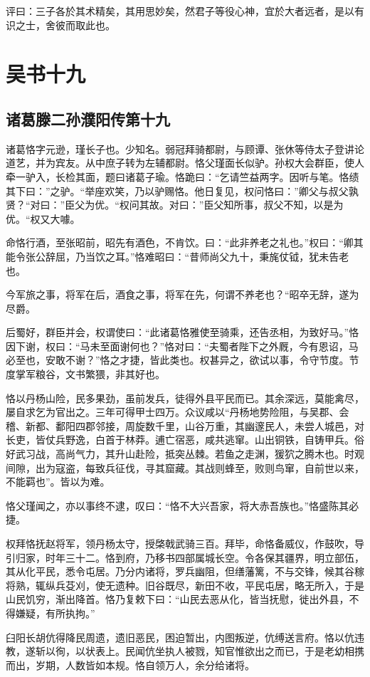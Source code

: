 \documentclass[12pt,UTF8]{ctexbook}
\begin{document}
评曰：三子各於其术精矣，其用思妙矣，然君子等役心神，宜於大者远者，是以有识之士，舍彼而取此也。

\part{吴书十九}
\chapter{诸葛滕二孙濮阳传第十九}

诸葛恪字元逊，瑾长子也。少知名。弱冠拜骑都尉，与顾谭、张休等侍太子登讲论道艺，并为宾友。从中庶子转为左辅都尉。恪父瑾面长似驴。孙权大会群臣，使人牵一驴入，长检其面，题曰诸葛子瑜。恪跪曰：“乞请竺益两字。因听与笔。恪绩其下曰：”之驴。“举座欢笑，乃以驴赐恪。他日复见，权问恪曰：”卿父与叔父孰贤？“对曰：”臣父为优。“权问其故。对曰：”臣父知所事，叔父不知，以是为优。“权又大噱。

命恪行酒，至张昭前，昭先有酒色，不肯饮。曰：“此非养老之礼也。”权曰：“卿其能令张公辞屈，乃当饮之耳。”恪难昭曰：“昔师尚父九十，秉旄仗钺，犹未告老也。

今军旅之事，将军在后，酒食之事，将军在先，何谓不养老也？“昭卒无辞，遂为尽爵。

后蜀好，群臣并会，权谓使曰：“此诸葛恪雅使至骑乘，还告丞相，为致好马。”恪因下谢，权曰：“马未至面谢何也？”恪对曰：“夫蜀者陛下之外厩，今有恩诏，马必至也，安敢不谢？”恪之才捷，皆此类也。权甚异之，欲试以事，令守节度。节度掌军粮谷，文书繁猥，非其好也。

恪以丹杨山险，民多果劲，虽前发兵，徒得外县平民而已。其余深远，莫能禽尽，屡自求乞为官出之。三年可得甲士四万。众议咸以“丹杨地势险阻，与吴郡、会稽、新都、鄱阳四郡邻接，周旋数千里，山谷万重，其幽邃民人，未尝人城邑，对长吏，皆仗兵野逸，白首于林莽。逋亡宿恶，咸共逃窜。山出铜铁，自铸甲兵。俗好武习战，高尚气力，其升山赴险，抵突丛棘。若鱼之走渊，猨狖之腾木也。时观间隙，出为寇盗，每致兵征伐，寻其窟藏。其战则蜂至，败则鸟窜，自前世以来，不能羁也”。皆以为难。

恪父瑾闻之，亦以事终不逮，叹曰：“恪不大兴吾家，将大赤吾族也。”恪盛陈其必捷。

权拜恪抚赵将军，领丹杨太守，授棨戟武骑三百。拜毕，命恪备威仪，作鼓吹，导引归家，时年三十二。恪到府，乃移书四部属城长空。令各保其疆界，明立部伍，其从化平民，悉令屯居。乃分内诸将，罗兵幽阻，但缮藩篱，不与交锋，候其谷稼将熟，辄纵兵芟刈，使无遗种。旧谷既尽，新田不收，平民屯居，略无所入，于是山民饥穷，渐出降首。恪乃复敕下曰：“山民去恶从化，皆当抚慰，徙出外县，不得嫌疑，有所执拘。”

臼阳长胡伉得降民周遗，遗旧恶民，困迫暂出，内图叛逆，伉缚送言府。恪以伉违教，遂斩以徇，以状表上。民闻伉坐执人被戮，知官惟欲出之而已，于是老幼相携而出，岁期，人数皆如本规。恪自领万人，余分给诸将。
\end{document}
